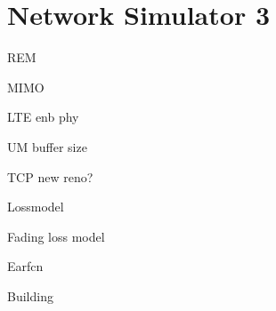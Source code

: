 \chapter{Network Simulator 3}
\label{sec:ns3}



REM

MIMO

LTE enb phy

UM buffer size

TCP new reno?

Lossmodel

Fading loss model

Earfcn


Building